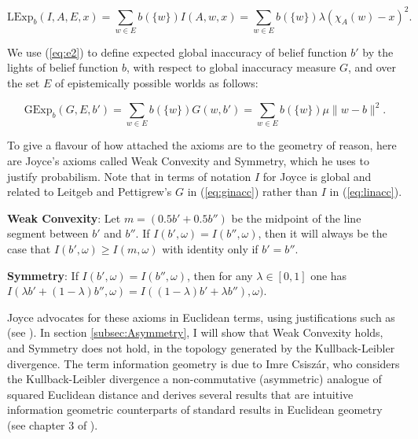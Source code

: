 \documentclass[11pt]{article}
\begin{document}
\begin{equation}
  \label{eq:eli}
  \mbox{LExp}_{b}(I,A,E,x)=\sum_{w\in{}E}b(\{w\})I(A,w,x)=\sum_{w\in{}E}b(\{w\})\lambda\left(\chi_{A}(w)-x\right)^{2}.
\end{equation}

We use (\ref{eq:e2}) to define expected global inaccuracy of belief
function $b'$ by the lights of belief function $b$, with respect to
global inaccuracy measure $G$, and over the set $E$ of epistemically
possible worlds as follows:

\begin{equation}
  \label{eq:egi}
  \mbox{GExp}_{b}(G,E,b')=\sum_{w\in{}E}b(\{w\})G(w,b')=\sum_{w\in{}E}b(\{w\})\mu\|w-b\|^{2}.
\end{equation}

To give a flavour of how attached the axioms are to the geometry of
reason, here are Joyce's axioms called Weak Convexity and Symmetry,
which he uses to justify probabilism. Note that in terms of notation
$I$ for Joyce is global and related to Leitgeb and Pettigrew's $G$ in
(\ref{eq:ginacc}) rather than $I$ in (\ref{eq:linacc}).

\begin{quotex}
\label{quot:weakconv}
  \textbf{Weak Convexity}: Let $m=(0.5b'+0.5b'')$ be the midpoint of the line
  segment between $b'$ and $b''$. If $I(b',\omega)=I(b'',\omega)$,
  then it will always be the case that $I(b',\omega)\geq{}I(m,\omega)$
  with identity only if $b'=b''$.
\end{quotex}

\begin{quotex}
\label{quot:symmetry}
  \textbf{Symmetry}: If $I(b',\omega)=I(b'',\omega)$, then for any
  $\lambda\in{}[0,1]$ one has\newline
  $I(\lambda{}b'+(1-\lambda)b'',\omega)=I((1-\lambda){}b'+\lambda{}b''),\omega)$.
\end{quotex}

Joyce advocates for these axioms in Euclidean terms, using
justifications such as  (see ). In section
\ref{subsec:Asymmetry}, I will show that Weak Convexity holds, and
Symmetry does not hold, in  the topology
generated by the Kullback-Leibler divergence. The term information
geometry is due to Imre Csisz{\'a}r, who considers the
Kullback-Leibler divergence a non-commutative (asymmetric) analogue of
squared Euclidean distance and derives several results that are
intuitive information geometric counterparts of standard results in
Euclidean geometry (see chapter 3 of ).
\end{document}
